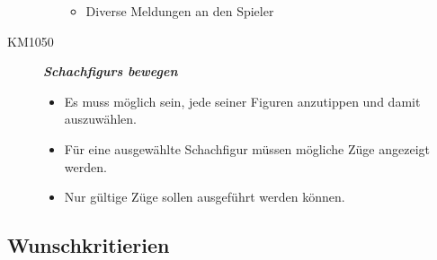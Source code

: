 \documentclass[parskip=full]{scrartcl}
\begin{document}
\begin{description}
\begin{itemize}
\begin{itemize}
				\item Diverse Meldungen an den Spieler
			\end{itemize}
		\end{itemize}
		\item[KM1050] \textbf{\textit{\glspl{Schachfigur} bewegen}}
		\begin{itemize}
			\item Es muss möglich sein, jede seiner Figuren anzutippen und damit auszuwählen.
			\item Für eine ausgewählte \gls{Schachfigur} müssen mögliche Züge angezeigt werden.
			\item Nur gültige Züge sollen ausgeführt werden können.
		\end{itemize}
	\end{description}
	
	\subsection{Wunschkritierien}
\end{document}
